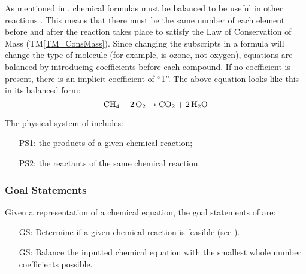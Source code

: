 \documentclass[12pt]{article}
\newcommand{\tref}[1]{TM\ref{#1}}
\newcounter{goalnum} %
\begin{document}
 As mentioned in
, chemical formulas must be balanced to be
useful in other reactions \cite{lund_introduction_2023}. This means that there
must be the same number of each element before and after the reaction takes
place to satisfy the Law of Conservation of Mass (\tref{TM_ConsMass}). Since
changing the subscripts in a formula will change the type of molecule (for
example,  is ozone, not oxygen), equations are balanced by introducing
coefficients before each compound. If no coefficient is present, there is an
implicit coefficient of ``1''. The above equation looks like this in its
balanced form:
$$
  \ce{CH4} + \ce{2O2} \rightarrow \ce{CO2} + \ce{2H2O}
$$

The physical system of \progname{} includes:

\begin{itemize}

  \item[PS1:] the products of a given chemical reaction;

  \item[PS2:] the reactants of the same chemical reaction.

\end{itemize}


\subsubsection{Goal Statements} \label{sec_goals}
Given a representation of a chemical equation, the goal statements
of \progname{} are:

\begin{itemize}

  \item[GS\refstepcounter{goalnum}\thegoalnum \label{G_feasible}:] Determine if
    a given chemical reaction is feasible (see ).

  \item[GS\refstepcounter{goalnum}\thegoalnum \label{G_balance}:] Balance the
    inputted chemical equation with the smallest whole number coefficients
    possible.

\end{itemize}
\end{document}
